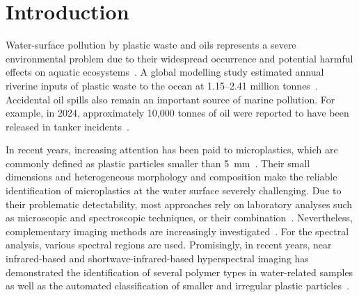 \documentclass[pdflatex,sn-apa]{sn-jnl}
\begin{document}
\linenumbers
\maketitle


\section{Introduction}

Water-surface pollution by plastic waste and oils represents a severe environmental problem due to their widespread occurrence and potential harmful effects on aquatic ecosystems~\citep{Beyer2016,Yusuf2022}. A global modelling study estimated annual riverine inputs of plastic waste to the ocean at 1.15--2.41 million tonnes~\citep{Lebreton2017}. Accidental oil spills also remain an important source of marine pollution. For example, in 2024, approximately 10,000 tonnes of oil were reported to have been released in tanker incidents~\citep{ITOPF2025}.

In recent years, increasing attention has been paid to microplastics, which are commonly defined as plastic particles smaller than 5~mm~\citep{Hartmann2019,Nihei2024}. Their small dimensions and heterogeneous morphology and composition make the reliable identification of microplastics at the water surface severely challenging. Due to their problematic detectability, most approaches rely on laboratory analyses such as microscopic and spectroscopic techniques, or their combination~\citep{HidalgoRuz2012,Prata2019,Yusuf2022}. Nevertheless, complementary imaging methods are increasingly investigated~\citep{Fang2023,Zhu2024}. For the spectral analysis, various spectral regions are used. Promisingly, in recent years, near infrared-based and shortwave-infrared-based hyperspectral imaging has demonstrated the identification of several polymer types in water-related samples as well as the automated classification of smaller and irregular plastic particles~\citep{Schmidt2018,Shan2019,Gebejes2024,Holt2025,Chatzitoulousis2026}.
\end{document}
